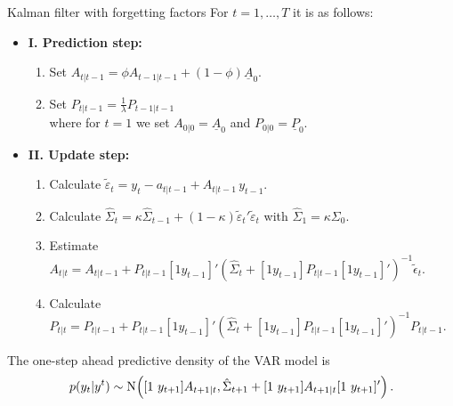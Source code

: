 \documentclass[9pt,xcolor=x11names,compress]{beamer}
\theoremstyle{standard}
\theoremstyle{notes}
\newcommand{\No}[1]{\text{N}\hspace{-0.05cm}\left(#1\right)}
\begin{document}
\begin{frame}{Kalman filter with forgetting factors}
	For $t=1,\ldots,T$ it is as follows:
	\begin{itemize}
		\item[] \textbf{I. Prediction step:}
		\begin{enumerate}
			\item Set $A_{t|t-1}=\phi A_{t-1|t-1}+(1-\phi)\underline{A}_0$.
			\item Set $P_{t|t-1}=\frac{1}{\lambda}P_{t-1|t-1}$\\
			where for $t=1$ we set $A_{0|0}=\underline{A}_0$ and $P_{0|0}=\underline{P}_0$.
		\end{enumerate}
		\item[] \textbf{II. Update step:}
		\begin{enumerate}
			\item Calculate $\tilde{\varepsilon}_t=y_t-a_{t|t-1}+A_{t|t-1}\,y_{t-1}$.
			\item Calculate $\hat{\Sigma}_t=\kappa\hat{\Sigma}_{t-1}+(1-\kappa)\tilde{\varepsilon}_t'\tilde{\varepsilon}_t$ with $\hat{\Sigma}_1=\kappa\Sigma_0$.
			\item Estimate $A_{t|t}=A_{t|t-1}+P_{t|t-1}[1 y_{t-1}]'\left(\hat{\Sigma}_t+[1 y_{t-1}]P_{t|t-1}[1 y_{t-1}]'\right)^{-1}\tilde{\epsilon}_t$.
			\item Calculate $P_{t|t}=P_{t|t-1}+P_{t|t-1}[1 y_{t-1}]'\left(\hat{\Sigma}_t+[1 y_{t-1}]P_{t|t-1}[1 y_{t-1}]'\right)^{-1}P_{t|t-1}$.
		\end{enumerate}
	\end{itemize}
\pause
\vspace{0.5cm}
	The one-step ahead predictive density of the VAR model is	\begin{equation}
	p(y_t|y^t)\sim\No{[1\,\, y_{t+1}]A_{t+1|t},\hat{\Sigma}_{t+1}+[1\,\, y_{t+1}]A_{t+1|t}[1\,\, y_{t+1}]'}.
	\end{equation}
\end{frame}
\end{document}
